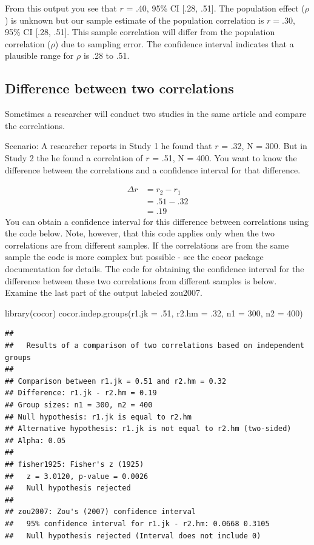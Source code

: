 \documentclass[
]{krantz}
\makeatletter
\newenvironment{Shaded}{\begin{snugshade}}{\end{snugshade}}
\newcommand{\AttributeTok}[1]{\textcolor[rgb]{0.61,0.61,0.61}{#1}}
\newcommand{\DecValTok}[1]{\textcolor[rgb]{0.06,0.06,0.06}{#1}}
\newcommand{\FunctionTok}[1]{\textcolor[rgb]{0,0,0}{#1}}
\newcommand{\NormalTok}[1]{#1}
\newenvironment{kframe}{%
\medskip{}
\setlength{\fboxsep}{.8em}
 \def\at@end@of@kframe{}%
 \ifinner\ifhmode%
  \def\at@end@of@kframe{\end{minipage}}%
  \begin{minipage}{\columnwidth}%
 \fi\fi%
 \def\FrameCommand##1{\hskip\@totalleftmargin \hskip-\fboxsep
 \colorbox{shadecolor}{##1}\hskip-\fboxsep
     \hskip-\linewidth \hskip-\@totalleftmargin \hskip\columnwidth}%
 \MakeFramed {\advance\hsize-\width
   \@totalleftmargin\z@ \linewidth\hsize
   \@setminipage}}%
 {\par\unskip\endMakeFramed%
 \at@end@of@kframe}
\renewenvironment{Shaded}{\begin{kframe}}{\end{kframe}}
\makeatother
\begin{document}
From this output you see that \(r\) = .40, 95\% CI {[}.28, .51{]}. The population effect (\(\rho\)) is unknown but our sample estimate of the population correlation is \(r = .30\), 95\% CI {[}.28, .51{]}. This sample correlation will differ from the population correlation (\(\rho\)) due to sampling error. The confidence interval indicates that a plausible range for \(\rho\) is .28 to .51.

\hypertarget{difference-between-two-correlations}{%
\subsection{Difference between two correlations}\label{difference-between-two-correlations}}

Sometimes a researcher will conduct two studies in the same article and compare the correlations.

Scenario: A researcher reports in Study 1 he found that \(r\) = .32, N = 300. But in Study 2 the he found a correlation of \(r\) = .51, N = 400. You want to know the difference between the correlations and a confidence interval for that difference.

\[
\begin{aligned}
\Delta r  &= r_2 - r_1 \\
&= .51 - .32 \\
&= .19
\end{aligned}
\]
You can obtain a confidence interval for this difference between correlations using the code below. Note, however, that this code applies only when the two correlations are from different samples. If the correlations are from the same sample the code is more complex but possible - see the cocor package documentation for details. The code for obtaining the confidence interval for the difference between these two correlations from different samples is below. Examine the last part of the output labeled zou2007.

\begin{Shaded}
\begin{Highlighting}[]
\FunctionTok{library}\NormalTok{(cocor)}
\FunctionTok{cocor.indep.groups}\NormalTok{(}\AttributeTok{r1.jk =}\NormalTok{ .}\DecValTok{51}\NormalTok{, }\AttributeTok{r2.hm =}\NormalTok{ .}\DecValTok{32}\NormalTok{, }\AttributeTok{n1 =} \DecValTok{300}\NormalTok{, }\AttributeTok{n2 =} \DecValTok{400}\NormalTok{)}
\end{Highlighting}
\end{Shaded}

\begin{verbatim}
## 
##   Results of a comparison of two correlations based on independent groups
## 
## Comparison between r1.jk = 0.51 and r2.hm = 0.32
## Difference: r1.jk - r2.hm = 0.19
## Group sizes: n1 = 300, n2 = 400
## Null hypothesis: r1.jk is equal to r2.hm
## Alternative hypothesis: r1.jk is not equal to r2.hm (two-sided)
## Alpha: 0.05
## 
## fisher1925: Fisher's z (1925)
##   z = 3.0120, p-value = 0.0026
##   Null hypothesis rejected
## 
## zou2007: Zou's (2007) confidence interval
##   95% confidence interval for r1.jk - r2.hm: 0.0668 0.3105
##   Null hypothesis rejected (Interval does not include 0)
\end{verbatim}
\end{document}
